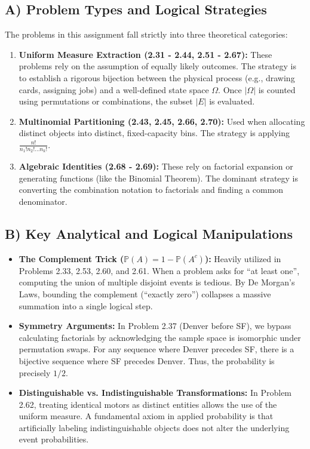 \documentclass[11pt]{article}
\theoremstyle{definition}
\begin{document}
\subsection{A) Problem Types and Logical Strategies}
The problems in this assignment fall strictly into three theoretical categories:
\begin{enumerate}
    \item \textbf{Uniform Measure Extraction (2.31 - 2.44, 2.51 - 2.67):} These problems rely on the assumption of equally likely outcomes. The strategy is to establish a rigorous bijection between the physical process (e.g., drawing cards, assigning jobs) and a well-defined state space $\Omega$. Once $|\Omega|$ is counted using permutations or combinations, the subset $|E|$ is evaluated.
    \item \textbf{Multinomial Partitioning (2.43, 2.45, 2.66, 2.70):} Used when allocating distinct objects into distinct, fixed-capacity bins. The strategy is applying $\frac{n!}{n_1! n_2! \dots n_k!}$.
    \item \textbf{Algebraic Identities (2.68 - 2.69):} These rely on factorial expansion or generating functions (like the Binomial Theorem). The dominant strategy is converting the combination notation to factorials and finding a common denominator.
\end{enumerate}

\subsection{B) Key Analytical and Logical Manipulations}
\begin{itemize}
    \item \textbf{The Complement Trick ($\mathbb{P}(A) = 1 - \mathbb{P}(A^c)$):} Heavily utilized in Problems 2.33, 2.53, 2.60, and 2.61. When a problem asks for ``at least one'', computing the union of multiple disjoint events is tedious. By De Morgan's Laws, bounding the complement (``exactly zero'') collapses a massive summation into a single logical step.
    \item \textbf{Symmetry Arguments:} In Problem 2.37 (Denver before SF), we bypass calculating factorials by acknowledging the sample space is isomorphic under permutation swaps. For any sequence where Denver precedes SF, there is a bijective sequence where SF precedes Denver. Thus, the probability is precisely $1/2$.
    \item \textbf{Distinguishable vs. Indistinguishable Transformations:} In Problem 2.62, treating identical motors as distinct entities allows the use of the uniform measure. A fundamental axiom in applied probability is that artificially labeling indistinguishable objects does not alter the underlying event probabilities.
\end{itemize}
\end{document}
